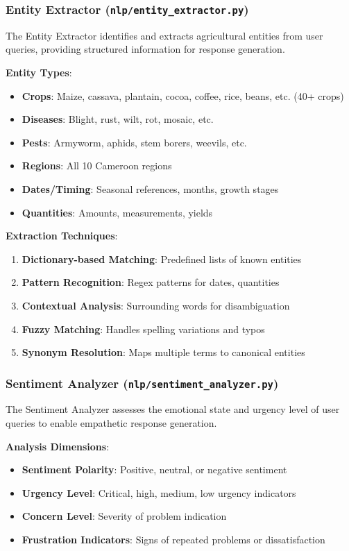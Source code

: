 \documentclass[12pt,a4paper]{article}
\begin{document}
\subsubsection{Entity Extractor (\texttt{nlp/entity\_extractor.py})}

The Entity Extractor identifies and extracts agricultural entities from user queries, providing structured information for response generation.

\textbf{Entity Types}:
\begin{itemize}[leftmargin=*]
    \item \textbf{Crops}: Maize, cassava, plantain, cocoa, coffee, rice, beans, etc. (40+ crops)
    \item \textbf{Diseases}: Blight, rust, wilt, rot, mosaic, etc.
    \item \textbf{Pests}: Armyworm, aphids, stem borers, weevils, etc.
    \item \textbf{Regions}: All 10 Cameroon regions
    \item \textbf{Dates/Timing}: Seasonal references, months, growth stages
    \item \textbf{Quantities}: Amounts, measurements, yields
\end{itemize}

\textbf{Extraction Techniques}:
\begin{enumerate}[leftmargin=*]
    \item \textbf{Dictionary-based Matching}: Predefined lists of known entities
    \item \textbf{Pattern Recognition}: Regex patterns for dates, quantities
    \item \textbf{Contextual Analysis}: Surrounding words for disambiguation
    \item \textbf{Fuzzy Matching}: Handles spelling variations and typos
    \item \textbf{Synonym Resolution}: Maps multiple terms to canonical entities
\end{enumerate}

\subsubsection{Sentiment Analyzer (\texttt{nlp/sentiment\_analyzer.py})}

The Sentiment Analyzer assesses the emotional state and urgency level of user queries to enable empathetic response generation.

\textbf{Analysis Dimensions}:
\begin{itemize}[leftmargin=*]
    \item \textbf{Sentiment Polarity}: Positive, neutral, or negative sentiment
    \item \textbf{Urgency Level}: Critical, high, medium, low urgency indicators
    \item \textbf{Concern Level}: Severity of problem indication
    \item \textbf{Frustration Indicators}: Signs of repeated problems or dissatisfaction
\end{itemize}
\end{document}

